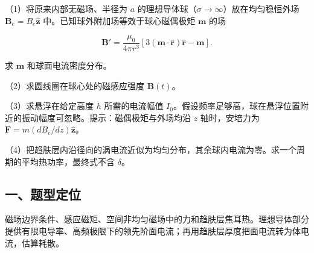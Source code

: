 \documentclass[12pt,a4paper,fontset=fandol]{ctexart}
\begin{document}
\begin{center}
\begin{minipage}{\linewidth}
\centering\begingroup{}
\ifdim\wd\diagrambox>.88\linewidth
\sbox{\diagrambox}{\resizebox{.88\linewidth}{!}{\usebox{\diagrambox}}}\fi
\ifdim\ht\diagrambox>.38\textheight
\resizebox{!}{.38\textheight}{\usebox{\diagrambox}}
\else\usebox{\diagrambox}\fi
\par{}\endgroup\end{minipage}\end{center}

（1）将原来内部无磁场、半径为 \(a\)
的理想导体球（\(\sigma\to\infty\)）放在均匀稳恒外场
\(\boldsymbol B_e=B_e\hat{\boldsymbol z}\)
中。已知球外附加场等效于球心磁偶极矩 \(\boldsymbol m\) 的场

\[\boldsymbol B'=\frac{\mu_0}{4\pi r^3}
[3(\boldsymbol m\cdot\hat{\boldsymbol r})\hat{\boldsymbol r}-\boldsymbol m].\]

求 \(\boldsymbol m\) 和球面电流密度分布。

（2）求圆线圈在球心处的磁感应强度 \(\boldsymbol B(t)\)。

（3）求悬浮在给定高度 \(h\) 所需的电流幅值
\(I_0\)。假设频率足够高，球在悬浮位置附近的振动幅度可忽略。提示：磁偶极矩与外场均沿
\(z\) 轴时，安培力为 \(\boldsymbol F=m(dB_e/dz)\hat{\boldsymbol z}\)。

（4）把趋肤层内沿径向的涡电流近似为均匀分布，其余球内电流为零。求一个周期的平均热功率，最终式不含
\(\delta\)。

\subsection{一、题型定位}\label{ux4e00ux9898ux578bux5b9aux4f4d-5}

磁场边界条件、感应磁矩、空间非均匀磁场中的力和趋肤层焦耳热。理想导体部分提供有限电导率、高频极限下的领先阶面电流；再用趋肤层厚度把面电流转为体电流，估算耗散。
\end{document}
